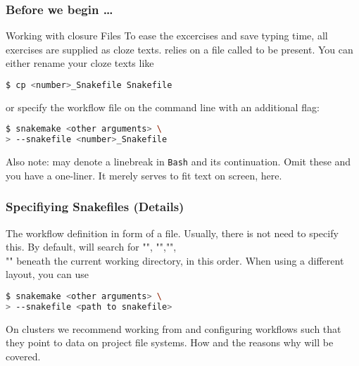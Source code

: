 \begin{frame}[fragile]
  \frametitle{Before we begin \ldots}
  \begin{exampleblock}{Working with closure Files}
    To ease the excercises and save typing time, all exercises are supplied as cloze texts.\linebreak
    \Snakemake{} relies on a file called  to be present. You can either rename your cloze texts like
    \begin{lstlisting}[language=Bash, style=Shell]
$ cp <number>_Snakefile Snakefile
    \end{lstlisting}
    or specify the workflow file on the command line with an additional flag:
    \begin{lstlisting}[language=Bash, style=Shell]
$ snakemake <other arguments> \
> --snakefile <number>_Snakefile
    \end{lstlisting}
    Also note: \altverb{\\} may denote a linebreak in \texttt{Bash} and \altverb{>} its continuation. Omit these and you have a one-liner. It merely serves to fit text on screen, here.
  \end{exampleblock}
\end{frame}

\begin{frame}[fragile]
	\frametitle{Specifiying Snakefiles (Details)}
	\begin{docs}
		The workflow definition in form of a file. Usually, there is not need to specify this. By default, \Snakemake{} will search for "", "","", \\"" beneath the current working directory, in this order.\newline
		When using a different layout, you can use
		\begin{lstlisting}[language=Bash, style=Shell]
$ snakemake <other arguments> \
> --snakefile <path to snakefile>
	    \end{lstlisting}
	\end{docs}
    \pause
    \begin{hint}
      On clusters we recommend working from  and configuring workflows such that they point to data on project file systems. How and the reasons why will be covered.
    \end{hint}
\end{frame}



